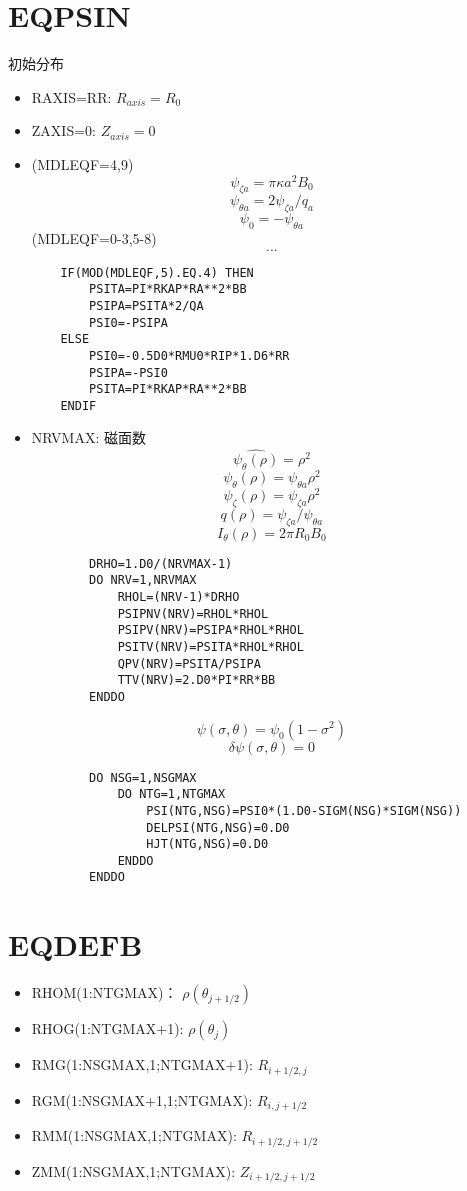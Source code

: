 \documentclass[11pt,a4paper]{article}
\begin{document}
\section{EQPSIN}
	初始分布
	\begin{itemize}
		\item{RAXIS=RR}:  $R_{axis} = R_0$
		\item{ZAXIS=0}: $Z_{axis} = 0$
	
	\item 	(MDLEQF=4,9)
			$$\psi_{\zeta{a}}=\pi\kappa{a^2}B_0$$
			$$\psi_{\theta{a}}=2\psi_{\zeta{a}}/q_a$$
			$$\psi_0 = -\psi_{\theta{a}}$$
			(MDLEQF=0-3,5-8)
			$$ ... $$
			
	\begin{lstlisting}
   	IF(MOD(MDLEQF,5).EQ.4) THEN
		PSITA=PI*RKAP*RA**2*BB
		PSIPA=PSITA*2/QA
		PSI0=-PSIPA
	ELSE
		PSI0=-0.5D0*RMU0*RIP*1.D6*RR
		PSIPA=-PSI0
		PSITA=PI*RKAP*RA**2*BB
	ENDIF
	\end{lstlisting}
	
	\item NRVMAX: 磁面数 
		$$ \hat{\psi_\theta(\rho)} = \rho^2 $$
		$$ \psi_\theta(\rho) = \psi_{\theta{a}}\rho^2 $$
		$$ \psi_\zeta(\rho) = \psi_{\zeta{a}}\rho^2 $$
		$$ q(\rho) = \psi_{\zeta{a}}/\psi_{\theta{a}} $$
		$$ I_\theta(\rho) = 2\pi R_0 B_0 $$
	\begin{lstlisting}
	 	DRHO=1.D0/(NRVMAX-1)
		DO NRV=1,NRVMAX
			RHOL=(NRV-1)*DRHO
			PSIPNV(NRV)=RHOL*RHOL
			PSIPV(NRV)=PSIPA*RHOL*RHOL
			PSITV(NRV)=PSITA*RHOL*RHOL
			QPV(NRV)=PSITA/PSIPA
			TTV(NRV)=2.D0*PI*RR*BB
		ENDDO
	\end{lstlisting}
		
		$$ \psi(\sigma,\theta)=\psi_0(1-\sigma^2) $$
		$$ \delta\psi(\sigma,\theta)=0 $$	
	\begin{lstlisting}
		DO NSG=1,NSGMAX
			DO NTG=1,NTGMAX
				PSI(NTG,NSG)=PSI0*(1.D0-SIGM(NSG)*SIGM(NSG))
				DELPSI(NTG,NSG)=0.D0
				HJT(NTG,NSG)=0.D0
			ENDDO
		ENDDO
	\end{lstlisting}
	
	\end{itemize}
	

\section{EQDEFB}
	\begin{itemize}
		\item RHOM(1:NTGMAX)： $\rho(\theta_{j+1/2})$
		\item RHOG(1:NTGMAX+1): $\rho(\theta_{j})$
		\item RMG(1:NSGMAX,1;NTGMAX+1): $R_{i+1/2,j}$
		\item RGM(1:NSGMAX+1,1;NTGMAX): $R_{i,j+1/2}$
		\item RMM(1:NSGMAX,1;NTGMAX): 	$R_{i+1/2,j+1/2}$
		\item ZMM(1:NSGMAX,1;NTGMAX):   $Z_{i+1/2,j+1/2}$
	\end{itemize}	
	
	
	
	
	
	
	
	
\end{document}
